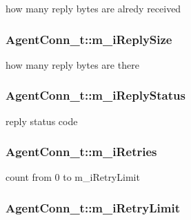 how many reply bytes are alredy received 

\hypertarget{structAgentConn__t_a118e79b17fe8cb55b9a7d25d607f431d}{
\subsubsection[{m\-\_\-i\-Reply\-Size}]{ Agent\-Conn\-\_\-t\-::m\-\_\-i\-Reply\-Size}}\label{structAgentConn__t_a118e79b17fe8cb55b9a7d25d607f431d}


how many reply bytes are there 

\hypertarget{structAgentConn__t_a3aea30ff4e6deae995a681bdf4b5a504}{
\subsubsection[{m\-\_\-i\-Reply\-Status}]{ Agent\-Conn\-\_\-t\-::m\-\_\-i\-Reply\-Status}}\label{structAgentConn__t_a3aea30ff4e6deae995a681bdf4b5a504}


reply status code 

\hypertarget{structAgentConn__t_aa433a6e029e33cee67b34d07ec24f397}{
\subsubsection[{m\-\_\-i\-Retries}]{ Agent\-Conn\-\_\-t\-::m\-\_\-i\-Retries}}\label{structAgentConn__t_aa433a6e029e33cee67b34d07ec24f397}


count from 0 to m\-\_\-i\-Retry\-Limit 

\hypertarget{structAgentConn__t_a24f72eb1cfc5a147ba190887f62e1680}{
\subsubsection[{m\-\_\-i\-Retry\-Limit}]{ Agent\-Conn\-\_\-t\-::m\-\_\-i\-Retry\-Limit}}\label{structAgentConn__t_a24f72eb1cfc5a147ba190887f62e1680}


